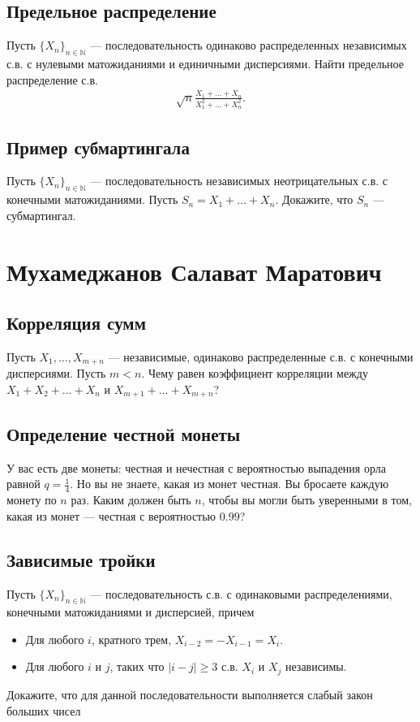\documentclass[12pt]{article}
\newcommand\N{\mathbb{N}}
\begin{document}
\subsection{Предельное распределение}

Пусть $\{X_n\}_{n \in \N}$ --- последовательность одинаково распределенных независимых с.в. с нулевыми матожиданиями и единичными дисперсиями. Найти предельное распределение с.в.
\begin{align*}
    \sqrt{n}\frac{X_1 + \dots + X_n}{X_1^2 + \dots + X_n^2}.
\end{align*}

\subsection{Пример субмартингала}

Пусть $\{X_n\}_{n \in \N}$ --- последовательность независимых неотрицательных с.в. с конечными матожиданиями. Пусть $S_n = X_1 + \dots + X_n$. Докажите, что $S_n$ --- субмартингал.

\newpage
\section{Мухамеджанов Салават Маратович}

\subsection{Корреляция сумм}

Пусть $X_1, \dots, X_{m + n}$ --- независимые, одинаково распределенные с.в. с конечными дисперсиями. Пусть $m < n$. Чему равен коэффициент корреляции между $X_1 + X_2 + \dots + X_n$ и $X_{m + 1} + \dots + X_{m + n}$?

\subsection{Определение честной монеты}

У вас есть две монеты: честная и нечестная с вероятностью выпадения орла равной $q = \frac{1}{4}$. Но вы не знаете, какая из монет честная. Вы бросаете каждую монету по $n$ раз. Каким должен быть $n$, чтобы вы могли быть уверенными в том, какая из монет --- честная с вероятностью $0.99$? 


\subsection{Зависимые тройки}
Пусть $\{X_n\}_{n \in \N}$ --- последовательность с.в. с одинаковыми распределениями, конечными матожиданиями и дисперсией, причем
\begin{itemize}
    \item Для любого $i$, кратного трем, $X_{i - 2} = - X_{i - 1} = X_{i}$. 
    \item Для любого $i$ и $j$, таких что $|i - j| \ge 3$ с.в. $X_i$ и $X_j$ независимы.
\end{itemize}
Докажите, что для данной последовательности выполняется слабый закон больших чисел
\end{document}

